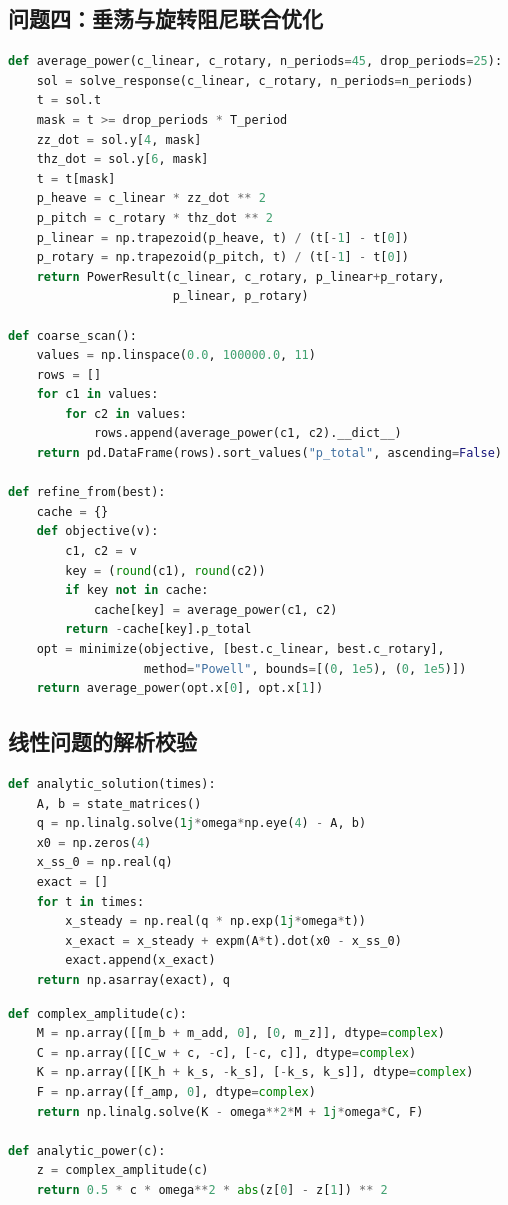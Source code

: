 \subsection{问题四：垂荡与旋转阻尼联合优化}

\begin{lstlisting}[language=Python,caption={问题四平均功率计算和局部优化核心片段}]
def average_power(c_linear, c_rotary, n_periods=45, drop_periods=25):
    sol = solve_response(c_linear, c_rotary, n_periods=n_periods)
    t = sol.t
    mask = t >= drop_periods * T_period
    zz_dot = sol.y[4, mask]
    thz_dot = sol.y[6, mask]
    t = t[mask]
    p_heave = c_linear * zz_dot ** 2
    p_pitch = c_rotary * thz_dot ** 2
    p_linear = np.trapezoid(p_heave, t) / (t[-1] - t[0])
    p_rotary = np.trapezoid(p_pitch, t) / (t[-1] - t[0])
    return PowerResult(c_linear, c_rotary, p_linear+p_rotary,
                       p_linear, p_rotary)

def coarse_scan():
    values = np.linspace(0.0, 100000.0, 11)
    rows = []
    for c1 in values:
        for c2 in values:
            rows.append(average_power(c1, c2).__dict__)
    return pd.DataFrame(rows).sort_values("p_total", ascending=False)

def refine_from(best):
    cache = {}
    def objective(v):
        c1, c2 = v
        key = (round(c1), round(c2))
        if key not in cache:
            cache[key] = average_power(c1, c2)
        return -cache[key].p_total
    opt = minimize(objective, [best.c_linear, best.c_rotary],
                   method="Powell", bounds=[(0, 1e5), (0, 1e5)])
    return average_power(opt.x[0], opt.x[1])
\end{lstlisting}

\subsection{线性问题的解析校验}

\begin{lstlisting}[language=Python,caption={问题一线性阻尼时域解析解核心片段}]
def analytic_solution(times):
    A, b = state_matrices()
    q = np.linalg.solve(1j*omega*np.eye(4) - A, b)
    x0 = np.zeros(4)
    x_ss_0 = np.real(q)
    exact = []
    for t in times:
        x_steady = np.real(q * np.exp(1j*omega*t))
        x_exact = x_steady + expm(A*t).dot(x0 - x_ss_0)
        exact.append(x_exact)
    return np.asarray(exact), q
\end{lstlisting}

\begin{lstlisting}[language=Python,caption={问题二线性阻尼稳态功率解析优化核心片段}]
def complex_amplitude(c):
    M = np.array([[m_b + m_add, 0], [0, m_z]], dtype=complex)
    C = np.array([[C_w + c, -c], [-c, c]], dtype=complex)
    K = np.array([[K_h + k_s, -k_s], [-k_s, k_s]], dtype=complex)
    F = np.array([f_amp, 0], dtype=complex)
    return np.linalg.solve(K - omega**2*M + 1j*omega*C, F)

def analytic_power(c):
    z = complex_amplitude(c)
    return 0.5 * c * omega**2 * abs(z[0] - z[1]) ** 2
\end{lstlisting}
